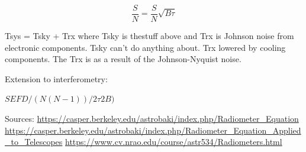 \begin{equation}
  \frac{S}{N} = \frac{S}{N}\sqrt{B\tau}
\end{equation}

Tsys = Tsky + Trx where Tsky is thestuff above and Trx is Johnson noise from electronic components. Tsky can't do anything about. Trx lowered by cooling components. 
The Trx is as a result of the Johnson-Nyquist noise. 

Extension to interferometry:

\(SEFD / (N(N-1))/2 \tau 2B)\)

Sources: \url{https://casper.berkeley.edu/astrobaki/index.php/Radiometer_Equation}
\url{https://casper.berkeley.edu/astrobaki/index.php/Radiometer_Equation_Applied_to_Telescopes}
\url{https://www.cv.nrao.edu/course/astr534/Radiometers.html}

